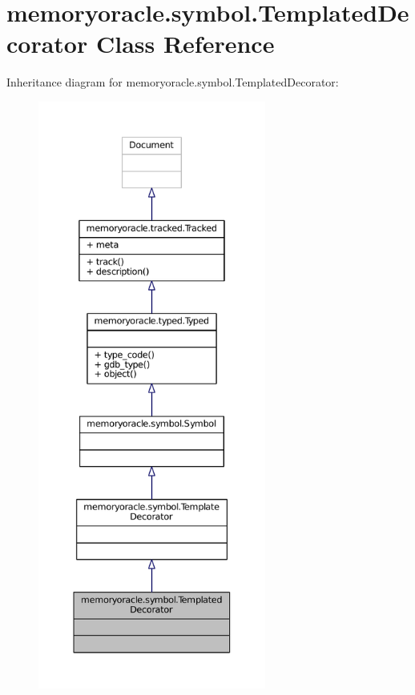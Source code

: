 \hypertarget{classmemoryoracle_1_1symbol_1_1TemplatedDecorator}{}\section{memoryoracle.\+symbol.\+Templated\+Decorator Class Reference}
\label{classmemoryoracle_1_1symbol_1_1TemplatedDecorator}


Inheritance diagram for memoryoracle.\+symbol.\+Templated\+Decorator\+:
\nopagebreak
\begin{figure}[H]
\begin{center}
\leavevmode
\includegraphics[height=550pt]{classmemoryoracle_1_1symbol_1_1TemplatedDecorator__inherit__graph}
\end{center}
\end{figure}



